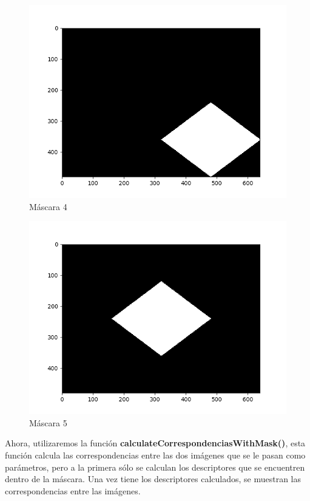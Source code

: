 	\begin{figure}[H]
		\centering
		\includegraphics[scale=0.4]{./imagenes/mask4.png}
		\caption{Máscara 4}
		\label{fig:mask4}
	\end{figure}
	
	\begin{figure}[H]
		\centering
		\includegraphics[scale=0.4]{./imagenes/mask5.png}
		\caption{Máscara 5}
		\label{fig:mask5}
	\end{figure}

	\vspace{0.06in}
	Ahora, utilizaremos la función \textbf{calculateCorrespondenciasWithMask()}, esta función calcula las correspondencias entre las dos imágenes que se le pasan como parámetros, pero a la primera sólo se calculan los descriptores que se encuentren dentro de la máscara. Una vez tiene los descriptores calculados, se muestran las correspondencias entre las imágenes.
	

